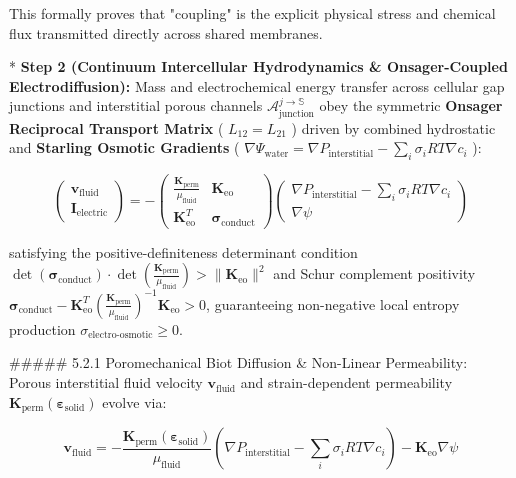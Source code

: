 \documentclass[11pt,a4paper]{article}
\theoremstyle{definition}
\theoremstyle{remark}
\begin{document}
This formally proves that "coupling" is the explicit physical stress and chemical flux transmitted directly across shared membranes.

* \textbf{Step 2 (Continuum Intercellular Hydrodynamics \& Onsager-Coupled Electrodiffusion):}
Mass and electrochemical energy transfer across cellular gap junctions and interstitial porous channels $\mathcal{A}_{\text{junction}}^{j \to \mathbb{S}}$ obey the symmetric \textbf{Onsager Reciprocal Transport Matrix} ( $L_{12} = L_{21}$ ) driven by combined hydrostatic and \textbf{Starling Osmotic Gradients} ( $\nabla \Psi_{\text{water}} = \nabla P_{\text{interstitial}} - \sum_i \sigma_i R T \nabla c_i$ ):


\begin{equation}
\begin{pmatrix} \mathbf{v}_{\text{fluid}} \\ \mathbf{I}_{\text{electric}} \end{pmatrix} = -\begin{pmatrix} \frac{\mathbf{K}_{\text{perm}}}{\mu_{\text{fluid}}} & \mathbf{K}_{\text{eo}} \\ \mathbf{K}_{\text{eo}}^T & \boldsymbol{\sigma}_{\text{conduct}} \end{pmatrix} \begin{pmatrix} \nabla P_{\text{interstitial}} - \sum_i \sigma_i R T \nabla c_i \\ \nabla \psi \end{pmatrix}
\end{equation}


satisfying the positive-definiteness determinant condition $\det(\boldsymbol{\sigma}_{\text{conduct}}) \cdot \det\left(\frac{\mathbf{K}_{\text{perm}}}{\mu_{\text{fluid}}}\right) > \|\mathbf{K}_{\text{eo}}\|^2$ and Schur complement positivity $\boldsymbol{\sigma}_{\text{conduct}} - \mathbf{K}_{\text{eo}}^T \left(\frac{\mathbf{K}_{\text{perm}}}{\mu_{\text{fluid}}}\right)^{-1} \mathbf{K}_{\text{eo}} > 0$, guaranteeing non-negative local entropy production $\sigma_{\text{electro-osmotic}} \ge 0$.

\#\#\#\#\# 5.2.1 Poromechanical Biot Diffusion \& Non-Linear Permeability:
Porous interstitial fluid velocity $\mathbf{v}_{\text{fluid}}$ and strain-dependent permeability $\mathbf{K}_{\text{perm}}(\boldsymbol{\varepsilon}_{\text{solid}})$ evolve via:


\begin{equation}
\mathbf{v}_{\text{fluid}} = -\frac{\mathbf{K}_{\text{perm}}(\boldsymbol{\varepsilon}_{\text{solid}})}{\mu_{\text{fluid}}} \left( \nabla P_{\text{interstitial}} - \sum_i \sigma_i R T \nabla c_i \right) - \mathbf{K}_{\text{eo}} \nabla \psi
\end{equation}
\end{document}
